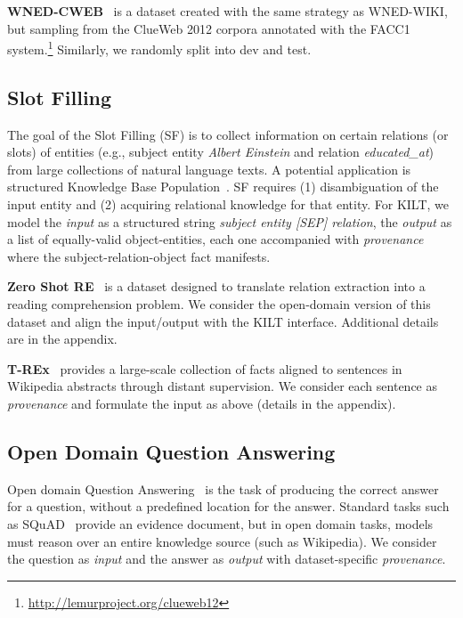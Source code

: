 \documentclass[11pt]{article}
\begin{document}
\textbf{WNED-CWEB}~\cite{guo2018robust} is a dataset created with the same strategy as   WNED-WIKI, but sampling from the ClueWeb 2012 corpora annotated with the FACC1 system.\footnote{\url{http://lemurproject.org/clueweb12}} Similarly, we randomly split into dev and test.

\subsection{Slot Filling}

The goal of the Slot Filling (SF) is to collect information on
certain relations (or slots) of entities (e.g., subject entity \textit{Albert Einstein} and relation \textit{educated\_at}) from large
collections of natural language texts. A potential application is structured Knowledge Base Population~\cite[KBP][]{surdeanu2014overview}. 
SF requires (1) disambiguation of the input entity and (2) acquiring relational knowledge for that entity. For KILT, we model the \textit{input} as a structured string \emph{subject entity \textit{[SEP]} relation}, the \textit{output} as a list of equally-valid object-entities, each one accompanied with \textit{provenance} where the subject-relation-object fact manifests.


\textbf{Zero Shot RE}~\cite{levy2017zero} is a dataset designed to translate relation extraction  
into a reading comprehension problem.
We consider the open-domain version of this dataset and align the input/output with the KILT interface. Additional details are in the appendix.


\textbf{T-REx}~\cite{elsahar2019t} provides a large-scale collection of facts aligned to sentences in Wikipedia abstracts through distant supervision. We consider each sentence as \textit{provenance} and formulate the input as above (details in the appendix).

\subsection{Open Domain Question Answering}

Open domain Question Answering~\cite{chen2017reading} is the task of producing the correct answer for a question, without a predefined location for the answer. Standard tasks such as SQuAD~\cite{rajpurkar2016squad} provide an evidence document, but in open domain tasks, 
models must reason over an entire knowledge source (such as Wikipedia). We consider the question as \emph{input} and the answer as \emph{output} with dataset-specific \textit{provenance}.
\end{document}
